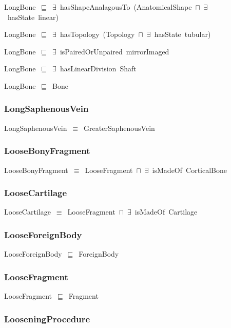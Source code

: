 \documentclass{article}
\begin{document}
LongBone~\ensuremath{\sqsubseteq}~\ensuremath{\exists}~hasShapeAnalagousTo~(AnatomicalShape~\ensuremath{\sqcap}~\ensuremath{\exists}~hasState~linear)~

LongBone~\ensuremath{\sqsubseteq}~\ensuremath{\exists}~hasTopology~(Topology~\ensuremath{\sqcap}~\ensuremath{\exists}~hasState~tubular)~

LongBone~\ensuremath{\sqsubseteq}~\ensuremath{\exists}~isPairedOrUnpaired~mirrorImaged~

LongBone~\ensuremath{\sqsubseteq}~\ensuremath{\exists}~hasLinearDivision~Shaft~

LongBone~\ensuremath{\sqsubseteq}~Bone~

\subsubsection*{LongSaphenousVein}

LongSaphenousVein~\ensuremath{\equiv}~GreaterSaphenousVein

\subsubsection*{LooseBonyFragment}

LooseBonyFragment~\ensuremath{\equiv}~LooseFragment~\ensuremath{\sqcap}~\ensuremath{\exists}~isMadeOf~CorticalBone

\subsubsection*{LooseCartilage}

LooseCartilage~\ensuremath{\equiv}~LooseFragment~\ensuremath{\sqcap}~\ensuremath{\exists}~isMadeOf~Cartilage

\subsubsection*{LooseForeignBody}

LooseForeignBody~\ensuremath{\sqsubseteq}~ForeignBody~

\subsubsection*{LooseFragment}

LooseFragment~\ensuremath{\sqsubseteq}~Fragment~

\subsubsection*{LooseningProcedure}
\end{document}
